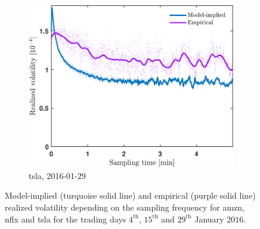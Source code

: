 \documentclass[11pt, a4paper]{thesis}  %
\begin{document}
\begin{figure}[H]
\begin{subfigure}[b]{0.3\textwidth}
        \label{figure:results:signature_plot:tsla:20160115}
    \end{subfigure}
    \hfill
    \begin{subfigure}[b]{0.3\textwidth}
        \centering
        \includegraphics[width=\textwidth]{./SignaturePlot/TSLA/20160129/signature_plot_predicted_vs_measured.pdf}
        \caption{\ac{tsla}, 2016-01-29}
        \label{figure:results:signature_plot:tsla:20160129}
    \end{subfigure}
    

    \caption{Model-implied (turquoise solid line) and empirical (purple solid line) 
	realized volatility depending on the sampling frequency for \ac{amzn}, \ac{nflx} and 
	\ac{tsla} for the trading days $4^\textrm{th}$, $15^\textrm{th}$ and $29^\textrm{th}$ January $2016$.}
    \label{figure:results:signature_plots}
\end{figure}


% 
%
\end{document}
